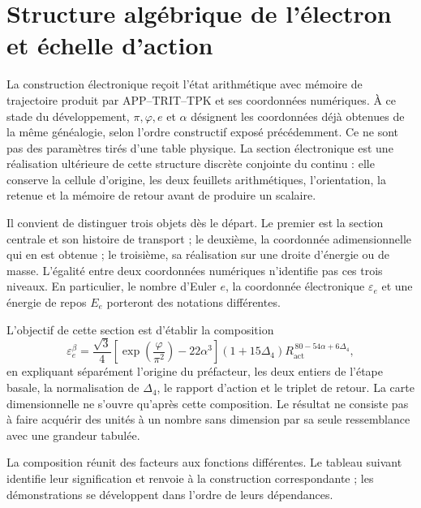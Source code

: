 \section{Structure algébrique de l'électron et échelle d'action}
\label{x_reciprocidad:sec:electron}

La construction électronique reçoit l'état arithmétique avec mémoire de trajectoire produit par APP--TRIT--TPK et ses coordonnées numériques. À ce stade du développement, \(\pi,\varphi,e\) et \(\alpha\) désignent les coordonnées déjà obtenues de la même généalogie, selon l'ordre constructif exposé précédemment. Ce ne sont pas des paramètres tirés d'une table physique. La section électronique est une réalisation ultérieure de cette structure discrète conjointe du continu : elle conserve la cellule d'origine, les deux feuillets arithmétiques, l'orientation, la retenue et la mémoire de retour avant de produire un scalaire.

Il convient de distinguer trois objets dès le départ. Le premier est la section
centrale et son histoire de transport ; le deuxième, la coordonnée
adimensionnelle qui en est obtenue ; le troisième, sa réalisation sur une
droite d'énergie ou de masse. L'égalité entre deux coordonnées numériques
n'identifie pas ces trois niveaux. En particulier, le nombre d'Euler \(e\),
la coordonnée électronique \(\varepsilon_e\) et une énergie de repos
\(E_e\) porteront des notations différentes.

L'objectif de cette section est d'établir la composition
\begin{equation}
 \varepsilon_e^{\beta}
 =\frac{\sqrt3}{4}
  \left[\exp\!\left(\frac{\varphi}{\pi^2}\right)-22\alpha^3\right]
  (1+15\Delta_4)
  R_{\mathrm{act}}^{\,80-54\alpha+6\Delta_4},
 \label{x_reciprocidad:eq:el-formula-completa}
\end{equation}
en expliquant séparément l'origine du préfacteur, les deux entiers de
l'étape basale, la normalisation de \(\Delta_4\), le rapport d'action et le
triplet de retour. La carte dimensionnelle ne s'ouvre qu'après
cette composition. Le résultat ne consiste pas à faire acquérir des unités à un nombre
sans dimension par sa seule ressemblance avec une grandeur
tabulée.

La composition réunit des facteurs aux fonctions différentes. Le tableau
suivant identifie leur signification et renvoie à la construction
correspondante ; les démonstrations se développent dans l'ordre de leurs
dépendances.

